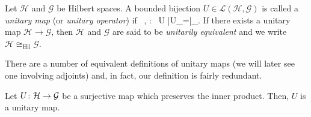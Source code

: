 \bd
Let $\mathcal{H}$ and $\mathcal{G}$ be Hilbert spaces. A bounded bijection $U\in\mathcal{L}(\mathcal{H},\mathcal{G})$ is called a \emph{unitary map} (or \emph{unitary operator}) if
\bse
\forall \, \psi,\varphi\in{} : \
\langle U \psi|U\varphi \rangle_{}=\langle \psi|\varphi \rangle_{}.
\ese
If there exists a unitary map $\mathcal{H}\to\mathcal{G}$, then $\mathcal{H}$ and $\mathcal{G}$ are said to be \emph{unitarily equivalent} and we write $\mathcal{H}\cong_{\mathrm{Hil}}\mathcal{G}$.
\ed

There are a number of equivalent definitions of unitary maps (we will later see one involving adjoints) and, in fact, our definition is fairly redundant. 

\bp
Let $U\colon\mathcal{H}\to\mathcal{G}$ be a surjective map which preserves the inner product. Then, $U$ is a unitary map.  
\ep

